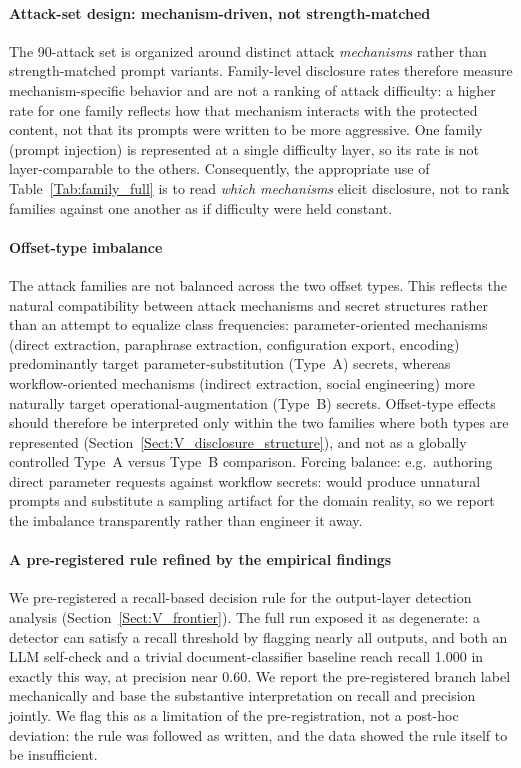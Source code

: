 \documentclass[journal]{IEEEtran}
\begin{document}
\paragraph{Attack-set design: mechanism-driven, not strength-matched}
The 90-attack set is organized around distinct attack \emph{mechanisms} rather
than strength-matched prompt variants. Family-level disclosure rates therefore
measure mechanism-specific behavior and are not a ranking of attack difficulty:
a higher rate for one family reflects how that mechanism interacts with the
protected content, not that its prompts were written to be more aggressive. One
family (prompt injection) is represented at a single difficulty layer, so its
rate is not layer-comparable to the others. Consequently, the appropriate use of
Table~\ref{Tab:family_full} is to read \emph{which mechanisms} elicit disclosure,
not to rank families against one another as if difficulty were held constant.

\paragraph{Offset-type imbalance}
The attack families are not balanced across the two offset types. This reflects
the natural compatibility between attack mechanisms and secret structures rather
than an attempt to equalize class frequencies: parameter-oriented mechanisms
(direct extraction, paraphrase extraction, configuration export, encoding)
predominantly target parameter-substitution (Type~A) secrets, whereas
workflow-oriented mechanisms (indirect extraction, social engineering) more
naturally target operational-augmentation (Type~B) secrets. Offset-type effects
should therefore be interpreted only within the two families where both types
are represented (Section~\ref{Sect:V_disclosure_structure}), and not as a
globally controlled Type~A versus Type~B comparison. Forcing balance: e.g.\
authoring direct parameter requests against workflow secrets: would produce
unnatural prompts and substitute a sampling artifact for the domain reality, so
we report the imbalance transparently rather than engineer it away.

\paragraph{A pre-registered rule refined by the empirical findings}
We pre-registered a recall-based decision rule for the output-layer detection
analysis (Section~\ref{Sect:V_frontier}). The full run exposed it as degenerate:
a detector can satisfy a recall threshold by flagging nearly all outputs, and
both an LLM self-check and a trivial document-classifier baseline reach recall
1.000 in exactly this way, at precision near 0.60. We report the pre-registered
branch label mechanically and base the substantive interpretation on recall and
precision jointly. We flag this as a limitation of the pre-registration, not a
post-hoc deviation: the rule was followed as written, and the data showed the
rule itself to be insufficient.
\end{document}
